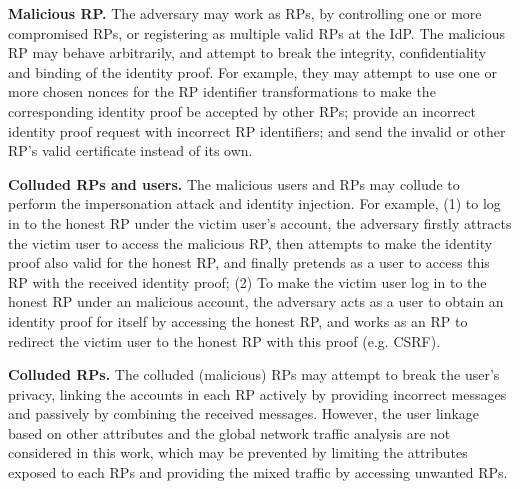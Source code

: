 \textbf{Malicious RP.} %
The adversary may work as RPs, by controlling one or more compromised RPs, or registering as multiple valid RPs at the IdP.
The malicious RP may behave arbitrarily, and attempt to break the integrity, confidentiality and binding of the identity proof.
For example, they may attempt to use one or more chosen nonces for the RP  identifier transformations to make the corresponding identity proof be  accepted by other RPs;
provide an incorrect identity proof request with incorrect RP identifiers;
and send the invalid or other RP's valid certificate instead of its own.


\textbf{Colluded RPs and users.} The malicious users and RPs may collude to perform the impersonation attack and identity injection.
For example, (1) to log in to the honest RP under the victim user's account, the adversary firstly attracts the victim user to access the malicious RP, then attempts to make the identity proof also valid for the honest RP, and finally pretends as a user to access this RP with the received identity proof;
(2) To make the victim user log in to the honest RP under an malicious account, the adversary acts as a user to obtain an identity proof for itself by accessing the honest RP, and works as an RP to redirect the victim user to the honest RP with this proof (e.g. CSRF).

\textbf{Colluded RPs.} The colluded (malicious) RPs may attempt to break the user's privacy, linking the accounts in each RP actively by providing incorrect messages
and passively by combining the received messages.
However, the user linkage based on other attributes and the global network traffic analysis are not considered in this work,
which may be prevented by limiting the attributes exposed to each RPs and providing the mixed traffic by accessing unwanted RPs.

